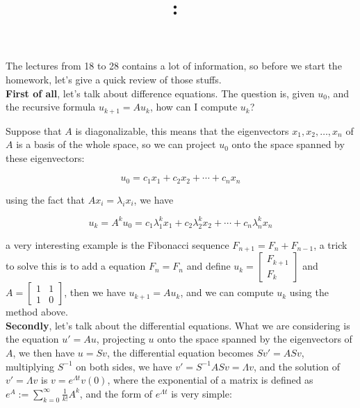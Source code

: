 \documentclass{article}
\title{
    \vspace{2in}
    \textmd{\textbf{\hmwkClass:\ \hmwkTitle}}\\
    \vspace{0.1in}\large{\textit{\hmwkClassInstructor}}
    \vspace{3in}
}
\author{\hmwkAuthorName}
\date{}
\begin{document}
\maketitle

\pagebreak

The lectures from 18 to 28 contains a lot of information, so
before we start the homework, let's give a quick review of those stuffs.
\\

\textbf{First of all}, let's talk about difference equations. The question is, given \( u_0 \), and the recursive formula \( u_{k+1} = Au_{k} \), how can I compute \( u_k \)?

Suppose that \( A \) is diagonalizable, this means that the eigenvectors \( x_1, x_2, \ldots, x_n \) of \( A \) is a basis of the whole space, so we can project \( u_0 \) onto the space spanned by these eigenvectors:

\[
    u_0 = c_1x_1 + c_2x_2 + \cdots + c_nx_n
\]

using the fact that \( Ax_i = \lambda_i x_i \), we have

\[
    u_k = A^k u_0 = c_1{\lambda_1^k}x_1 + c_2{\lambda_2^k}x_2 + \cdots + c_n{\lambda_n^k}x_n
\]

a very interesting example is the Fibonacci sequence \( F_{n+1} = F_{n} + F_{n-1} \), a trick to solve this is to add a equation \( F_n = F_n \) and
define \( u_k = \begin{bmatrix}
    F_{k+1} \\
    F_k
\end{bmatrix} \) and \( A = \begin{bmatrix}
    1 & 1 \\
    1 & 0
\end{bmatrix} \), then we have \( u_{k+1} = Au_k \), and we can compute \( u_k \) using the method above.
\\

\textbf{Secondly}, let's talk about the differential equations. What we are considering is the equation \( u' = Au \), 
projecting \( u \) onto the space spanned by the eigenvectors of \( A \), we then have \( u = Sv \), the differential equation becomes
\( Sv' = ASv \), multiplying \( S^{-1} \) on both sides, we have \( v' = S^{-1}ASv = \Lambda v \), and the solution of \( v' = \Lambda v \) is
\( v = e^{\Lambda t}v(0) \), where the exponential of a matrix is defined as \( e^A := \sum_{k=0}^{\infty} \frac{1}{k!} A^k \), and the form of \( e^{\Lambda t} \) is very
simple: 
\end{document}
